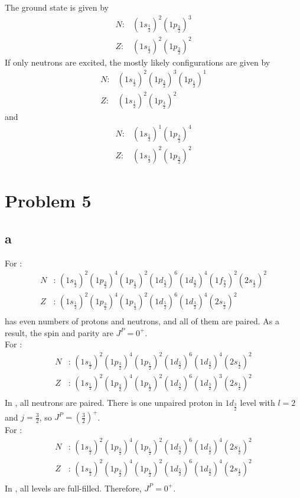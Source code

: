 \documentclass[a4paper]{article}
\theoremstyle{theorem}
\theoremstyle{definition}
\theoremstyle{lemma}
\theoremstyle{corollary}
\theoremstyle{remark}
\theoremstyle{axiom}
\begin{document}
The ground state is given by
\begin{align*}
  N:& (1s_{\frac{1}{2}})^2(1p_{\frac{3}{2}})^3 \\
  Z:& (1s_{\frac{1}{2}})^2(1p_{\frac{3}{2}})^2
\end{align*}
If only neutrons are excited,
the mostly likely configurations are given by
\begin{align*}
  N:& (1s_{\frac{1}{2}})^2(1p_{\frac{3}{2}})^3(1p_{\frac{1}{2}})^1 \\
  Z:& (1s_{\frac{1}{2}})^2(1p_{\frac{3}{2}})^2
\end{align*}
and
\begin{align*}
  N:& (1s_{\frac{1}{2}})^1(1p_{\frac{3}{2}})^4 \\
  Z:& (1s_{\frac{1}{2}})^2(1p_{\frac{3}{2}})^2
\end{align*}

\section*{Problem 5}

\subsection*{a}

For :
\begin{align*}
  N&:\, (1s_{\frac{1}{2}})^2(1p_{\frac{3}{2}})^4(1p_{\frac{1}{2}})^2(1d_{\frac{5}{2}})^6(1d_{\frac{3}{2}})^4(1f_{\frac{7}{2}})^2(2s_{\frac{1}{2}})^2 \\
  Z&:\, (1s_{\frac{1}{2}})^2(1p_{\frac{3}{2}})^4(1p_{\frac{1}{2}})^2(1d_{\frac{5}{2}})^6(1d_{\frac{3}{2}})^4(2s_{\frac{1}{2}})^2 \\
\end{align*}
 has even numbers of protons and neutrons,
and all of them are paired.
As a result,
the spin and parity are \(J^P = 0^+\). \\
For :
\begin{align*}
  N&:\, (1s_{\frac{1}{2}})^2(1p_{\frac{3}{2}})^4(1p_{\frac{1}{2}})^2(1d_{\frac{5}{2}})^6(1d_{\frac{3}{2}})^4(2s_{\frac{1}{2}})^2 \\
  Z&:\, (1s_{\frac{1}{2}})^2(1p_{\frac{3}{2}})^4(1p_{\frac{1}{2}})^2(1d_{\frac{5}{2}})^6(1d_{\frac{3}{2}})^3(2s_{\frac{1}{2}})^2 \\
\end{align*}
In , all neutrons are paired.
There is one unpaired proton in \(1d_{\frac{3}{2}}\) level with \(l = 2\) and \(j = \frac{3}{2}\),
so \(J^P = \left(\frac{3}{2}\right)^+\). \\
For :
\begin{align*}
  N&:\, (1s_{\frac{1}{2}})^2(1p_{\frac{3}{2}})^4(1p_{\frac{1}{2}})^2(1d_{\frac{5}{2}})^6(1d_{\frac{3}{2}})^4(2s_{\frac{1}{2}})^2 \\
  Z&:\, (1s_{\frac{1}{2}})^2(1p_{\frac{3}{2}})^4(1p_{\frac{1}{2}})^2(1d_{\frac{5}{2}})^6(1d_{\frac{3}{2}})^4(2s_{\frac{1}{2}})^2 \\
\end{align*}
In ,
all levels are full-filled.
Therefore,
\(J^P = 0^+\).
\end{document}
